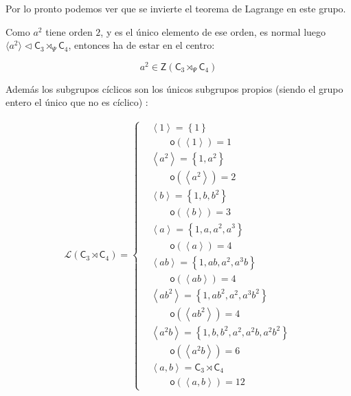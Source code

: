 \documentclass[12pt,a4paper,fleqn,spanish,final,openright]{extbook}
\theoremstyle{definition}
\theoremstyle{remark}
\begin{document}
Por lo pronto podemos ver que se invierte el teorema de Lagrange en este grupo.

Como $a^2$ tiene orden $2$, y es el único elemento de ese orden, es normal luego
$\langle a^2\rangle\lhd \mathsf{C}_{3}\rtimes_{\Psi } \mathsf{C}_{4}$,
entonces ha de estar en el centro:

\[a^2    \in \mathsf{Z}(\mathsf{C}_{3}\rtimes_{\Psi } \mathsf{C}_{4})\]

Además los subgrupos cíclicos son los únicos subgrupos propios (siendo el grupo entero
el único que no es cíclico) :

\begin{align*}
{\mathcal{L}}\left({{{\mathsf{C}}_{3}}\rtimes{{\mathsf{C}}_{4}}}\right) =
\begin{cases}
&{\left\langle{1}\right\rangle}={\left\lbrace{1}\right\rbrace}\\
&\qquad {\mathsf{o}}{\left({\left\langle{1}\right\rangle}\right)}=1\\
&{\left\langle{a^2}\right\rangle}={\left\lbrace{1,a^2}\right\rbrace}\\
&\qquad {\mathsf{o}}{\left({\left\langle{a^2}\right\rangle}\right)}=2\\
&{\left\langle{b}\right\rangle}={\left\lbrace{1,b,b^2}\right\rbrace}\\
&\qquad {\mathsf{o}}{\left({\left\langle{b}\right\rangle}\right)}=3\\
&{\left\langle{a}\right\rangle}={\left\lbrace{1,a,a^2,a^3}\right\rbrace}\\
&\qquad {\mathsf{o}}{\left({\left\langle{a}\right\rangle}\right)}=4\\
&{\left\langle{a b}\right\rangle}={\left\lbrace{1,ab,a^2,a^3b}\right\rbrace}\\
&\qquad {\mathsf{o}}{\left({\left\langle{a b}\right\rangle}\right)}=4\\
&{\left\langle{a b^2}\right\rangle}={\left\lbrace{1,ab^2,a^2,a^3b^2}\right\rbrace}\\
&\qquad {\mathsf{o}}{\left({\left\langle{a b^2}\right\rangle}\right)}=4\\
&{\left\langle{a^2 b}\right\rangle}={\left\lbrace{1,b,b^2,a^2,a^2b,a^2b^2}\right\rbrace}\\
&\qquad {\mathsf{o}}{\left({\left\langle{a^2 b}\right\rangle}\right)}=6\\
&{\left\langle{a , b}\right\rangle}={{{\mathsf{C}}_{3}}\rtimes{{\mathsf{C}}_{4}}}\\
&\qquad {\mathsf{o}}{\left({\left\langle{a , b}\right\rangle}\right)}=12
\end{cases}
\end{align*}
\end{document}
